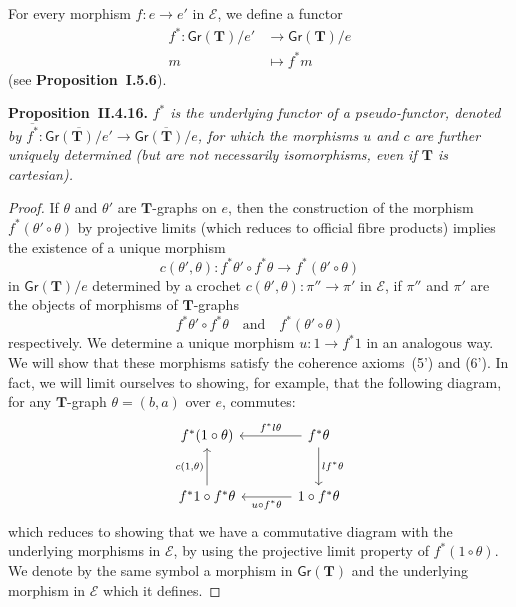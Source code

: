 \documentclass[fleqn]{article}
\newenvironment{itenv}[1]
  {\phantomsection\par\medskip\noindent\textbf{#1.}\itshape}
  {\par\medskip}
\newcommand{\oldpage}[1]{\marginpar{\footnotesize$\Big\vert$ \textit{p.~#1}}}
\newcommand{\unsure}[1]{{\color{purple}\textbf{#1}}}
\newcommand{\TT}{\mathbf{T}}
\newcommand{\textand}{\quad\text{and}\quad}
\newcommand{\cat}[1]{\mathcal{#1}}
\newcommand{\Cat}[1]{\mathsf{#1}}
\newcommand{\Gr}[1]{\Cat{Gr}(#1)}
\begin{document}
For every morphism $f\colon e\to e'$ in $\cat{E}$, we define a functor
\[
  \begin{aligned}
    f^*\colon \Gr{\TT}/e'
    &\to \Gr{\TT}/e
  \\m
    &\mapsto f^*m
  \end{aligned}
\]
(see \unsure{Proposition~I.5.6}).

\begin{itenv}{Proposition~II.4.16}
  \oldpage{263}
  $f^*$ is the underlying functor of a pseudo-functor, denoted by $\overline{f^*}\colon\overline{\Gr{\TT}/e'}\to\overline{\Gr{\TT}/e}$, for which the morphisms $u$ and $c$ are further uniquely determined \emph{(but are not necessarily isomorphisms, even if $\TT$ is cartesian)}.
\end{itenv}

\begin{proof}
  If $\theta$ and $\theta'$ are $\TT$-graphs on $e$, then the construction of the morphism $f^*(\theta'\circ\theta)$ by projective limits (which reduces to official fibre products) implies the existence of a unique morphism
  \[
    c(\theta',\theta)\colon f^*\theta'\circ f^*\theta
    \to f^*(\theta'\circ\theta)
  \]
  in $\Gr{\TT}/e$ determined by a crochet $c(\theta',\theta)\colon\pi''\to\pi'$ in $\cat{E}$, if $\pi''$ and $\pi'$ are the objects of morphisms of $\TT$-graphs
  \[
    f^*\theta'\circ f^*\theta
    \textand
    f^*(\theta'\circ\theta)
  \]
  respectively.
  We determine a unique morphism $u\colon 1\to f^*1$ in an analogous way.
  We will show that these morphisms satisfy the coherence axioms~(5') and (6').
  In fact, we will limit ourselves to showing, for example, that the following diagram, for any $\TT$-graph $\theta=(b,a)$ over $e$, commutes:
  \[
    \begin{tikzcd}[sep=large]
      f^*(1\circ\theta)
    & f^*\theta
        \ar[l,swap,"{f^*l\theta}"]
        \ar[d,"{lf^*\theta}"]
    \\f^*1\circ f^*\theta
        \ar[u,"{c(1,\theta)}"]
    & 1\circ f^*\theta
        \ar[l,"{u\circ f^*\theta}"]
    \end{tikzcd}
  \]
  which reduces to showing that we have a commutative diagram with the underlying morphisms in $\cat{E}$, by using the projective limit property of $f^*(1\circ\theta)$.
  We denote by the same symbol a morphism in $\Gr{\TT}$ and the underlying morphism in $\cat{E}$ which it defines.


\end{proof}
\end{document}
